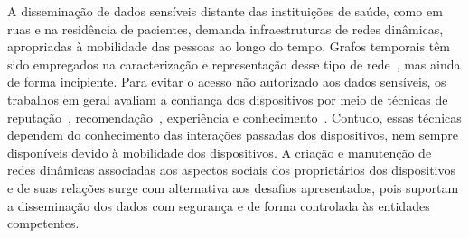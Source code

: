 \documentclass[12pt]{article}
\newcommand{\al}[1]{\textcolor{brown}{{\bf #1}}}
\newcommand{\agn}[1]{\textcolor{auburn}{#1}}
\begin{document}
\agn{A disseminação de dados sensíveis distante das instituições de saúde, como em ruas e na residência de pacientes, demanda infraestruturas de redes dinâmicas, apropriadas à mobilidade das pessoas ao longo do tempo. Grafos temporais têm sido empregados na caracterização e representação desse tipo de rede~\cite{nzeko2017time}, mas ainda de forma incipiente.}
Para evitar o acesso não autorizado aos dados sensíveis, os trabalhos em geral avaliam a confiança dos dispositivos por meio de técnicas de reputação~\cite{truong2017toward}, recomendação~\cite{al2017trust}, experiência e conhecimento~\cite{truong2017toward}.
\agn{Contudo, essas técnicas dependem do conhecimento das interações passadas dos dispositivos, nem sempre disponíveis devido à mobilidade dos dispositivos. A criação e manutenção de redes dinâmicas associadas aos aspectos sociais dos proprietários dos dispositivos e de suas relações surge com alternativa aos desafios apresentados, pois suportam a disseminação dos dados com segurança e de forma controlada às entidades competentes.}
\end{document}
